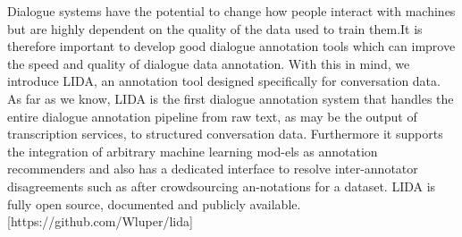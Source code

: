 Dialogue systems have the potential to change how  people  interact  with  machines  but  are highly  dependent  on  the  quality  of  the  data used  to  train  them.It  is  therefore  important to develop good dialogue annotation tools which can improve the speed and quality of dialogue data annotation.  With this in mind, we introduce LIDA, an annotation tool designed specifically  for  conversation  data.   As  far  as we know, LIDA is the first dialogue annotation system that handles the entire dialogue annotation  pipeline  from  raw  text,  as  may  be  the output of transcription services,  to structured conversation data. Furthermore it supports the integration of arbitrary machine learning mod-els as annotation recommenders and also has a dedicated interface to resolve inter-annotator disagreements such as after crowdsourcing an-notations  for  a  dataset.   LIDA  is  fully  open source, documented and publicly available.[https://github.com/Wluper/lida]